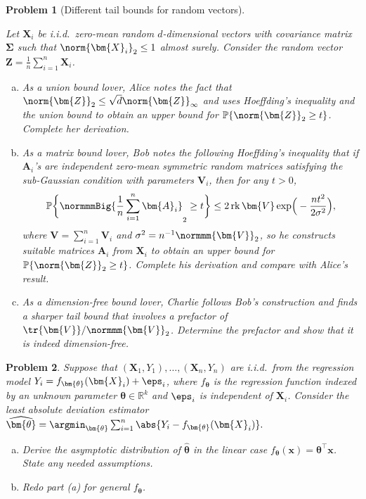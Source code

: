 \documentclass[11pt, a3paper, openany]{article}
\newcommand{\R}{\ensuremath{\mathbb{R}}}
\renewcommand{\P}{\mathbb{P}}
\newcommand{\rank}{\operatorname{rk}}
\theoremstyle{remark}
\theoremstyle{remark}
\theoremstyle{remark}
\newenvironment{Proof of claim}
  {\begin{proof}[\normalfont \textbf{Proof of claim}]}
  {\end{proof}}
\theoremstyle{definition}
\theoremstyle{remark}
\theoremstyle{plain}
\newtheorem{Prob}{Problem}
\begin{document}
\begin{Prob}[Different tail bounds for random vectors]\ 

Let $\bm{X}_{i}$ be i.i.d.\ zero-mean random $d$-dimensional vectors with covariance matrix $\bm{\Sigma}$ such that $\norm{\bm{X}_{i}}_{2} \leq 1$ almost surely. Consider the random vector $\bm{Z} = \frac{1}{n}\sum_{i=1}^{n}\bm{X}_{i}$. 
\begin{enumerate}[(a)]
	\setlength{\itemsep}{0pt}
\item As a union bound lover, Alice notes the fact that $\norm{\bm{Z}}_{2} \leq \sqrt{d}\norm{\bm{Z}}_{\infty}$ and uses Hoeffding's inequality and the union bound to obtain an upper bound for $\P\{ \norm{\bm{Z}}_{2} \geq t \}$. Complete her derivation.
\item As a matrix bound lover, Bob notes the following Hoeffding's inequality that if $\bm{A}_{i}$'s are independent zero-mean symmetric random matrices satisfying the sub-Gaussian condition with parameters $\bm{V}_{i}$, then for any $t > 0$, \vspace{-2ex}
\[ \P\bigg\{ \normmmBig{\frac{1}{n}\sum_{i=1}^{n}\bm{A}_{i}}_{2} \geq t \bigg\} \leq 2 \rank{\bm{V}} \exp\!\Big(-\frac{nt^{2}}{2\sigma^{2}}\Big) , \]
where $\bm{V} = \sum_{i=1}^{n}\bm{V}_{i}$ and $\sigma^{2} = n^{-1}\normmm{\bm{V}}_{2}$, so he constructs suitable matrices $\bm{A}_{i}$ from $\bm{X}_{i}$ to obtain an upper bound for $\P\{ \norm{\bm{Z}}_{2} \geq t \}$. Complete his derivation and compare with Alice's result. 
\item As a dimension-free bound lover, Charlie follows Bob's construction and finds a sharper tail bound that involves a prefactor of $\tr{\bm{V}}/\normmm{\bm{V}}_{2}$. Determine the prefactor and show that it is indeed dimension-free. 
\end{enumerate}
\end{Prob}


\begin{Prob}
Suppose that $(\bm{X}_{1},Y_{1}),\dots,(\bm{X}_{n},Y_{n})$ are i.i.d.\ from the regression model $Y_{i} = f_{\bm{\theta}}(\bm{X}_{i}) + \eps_{i}$, where $f_{\bm{\theta}}$ is the regression function indexed by an unknown parameter $\bm{\theta} \in \R^{k}$ and $\eps_{i}$ is independent of $\bm{X}_{i}$. Consider the least absolute deviation estimator 
$ \widehat{\bm{\theta}} = \argmin_{\bm{\theta}} \sum_{i=1}^{n} \abs{Y_{i}-f_{\bm{\theta}}(\bm{X}_{i})} . $
\begin{enumerate}[(a)]
	\setlength{\itemsep}{0pt}
\item Derive the asymptotic distribution of $\widehat{\bm{\theta}}$ in the linear case $f_{\bm{\theta}}(\bm{x}) = \bm{\theta}^{\top}\bm{x}$. State any needed assumptions. 
\item Redo part (a) for general $f_{\bm{\theta}}$. 
\end{enumerate}
\end{Prob}
\end{document}
